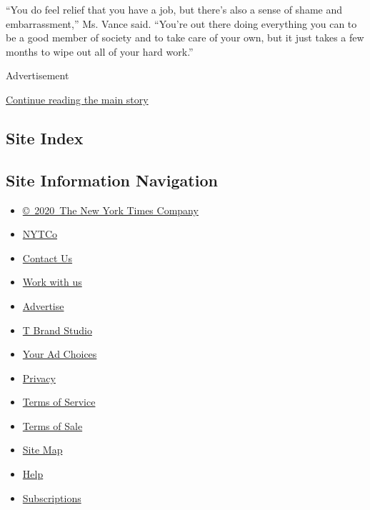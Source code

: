 ``You do feel relief that you have a job, but there's also a sense of
shame and embarrassment,'' Ms. Vance said. ``You're out there doing
everything you can to be a good member of society and to take care of
your own, but it just takes a few months to wipe out all of your hard
work.''

Advertisement

\protect\hyperlink{after-bottom}{Continue reading the main story}

\hypertarget{site-index}{%
\subsection{Site Index}\label{site-index}}

\hypertarget{site-information-navigation}{%
\subsection{Site Information
Navigation}\label{site-information-navigation}}

\begin{itemize}
\tightlist
\item
  \href{https://help.nytimes3xbfgragh.onion/hc/en-us/articles/115014792127-Copyright-notice}{©~2020~The
  New York Times Company}
\end{itemize}

\begin{itemize}
\tightlist
\item
  \href{https://www.nytco.com/}{NYTCo}
\item
  \href{https://help.nytimes3xbfgragh.onion/hc/en-us/articles/115015385887-Contact-Us}{Contact
  Us}
\item
  \href{https://www.nytco.com/careers/}{Work with us}
\item
  \href{https://nytmediakit.com/}{Advertise}
\item
  \href{http://www.tbrandstudio.com/}{T Brand Studio}
\item
  \href{https://www.nytimes3xbfgragh.onion/privacy/cookie-policy\#how-do-i-manage-trackers}{Your
  Ad Choices}
\item
  \href{https://www.nytimes3xbfgragh.onion/privacy}{Privacy}
\item
  \href{https://help.nytimes3xbfgragh.onion/hc/en-us/articles/115014893428-Terms-of-service}{Terms
  of Service}
\item
  \href{https://help.nytimes3xbfgragh.onion/hc/en-us/articles/115014893968-Terms-of-sale}{Terms
  of Sale}
\item
  \href{https://spiderbites.nytimes3xbfgragh.onion}{Site Map}
\item
  \href{https://help.nytimes3xbfgragh.onion/hc/en-us}{Help}
\item
  \href{https://www.nytimes3xbfgragh.onion/subscription?campaignId=37WXW}{Subscriptions}
\end{itemize}
